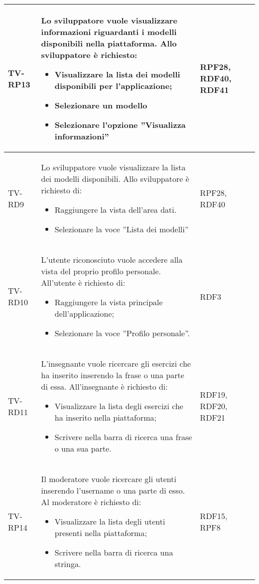 \begin{longtable}{|>{\centering\arraybackslash}m{1.6cm}|>{\centering\arraybackslash}m{6.41cm}|>{\centering\arraybackslash}m{3.1cm} | >{\centering\arraybackslash}m{2.6cm}|}
 TV-RP13 & Lo sviluppatore vuole visualizzare informazioni riguardanti i modelli disponibili nella piattaforma. Allo sviluppatore è richiesto:
 \begin{itemize}
  \item  Visualizzare la lista dei modelli disponibili per l’applicazione;
  \item Selezionare un modello
  \item Selezionare l’opzione ”Visualizza informazioni”
 \end{itemize}  & RPF28, RDF40, RDF41 \\ \hline

\rowcolor{LightGray}
TV-RD9 & Lo sviluppatore vuole visualizzare la lista dei modelli disponibili.  Allo sviluppatore è richiesto di:

\begin{itemize}
 \item Raggiungere la vista dell’area dati.
 \item Selezionare la voce ”Lista dei modelli”
\end{itemize}  & RPF28, RDF40 \\ \hline

TV-RD10 & L’utente riconosciuto vuole accedere alla vista del proprio profilo personale. All'utente è richiesto di:
\begin{itemize}
  \item Raggiungere la vista principale dell'applicazione;
 \item Selezionare la voce ”Profilo personale”.
\end{itemize}  & RDF3 \\ \hline

\rowcolor{LightGray}
TV-RD11 & L’insegnante vuole ricercare gli esercizi che ha inserito inserendo la frase o una parte di essa. All'insegnante è richiesto di:


\begin{itemize}
 \item Visualizzare la lista degli esercizi che ha inserito nella piattaforma;
 \item Scrivere nella barra di ricerca una frase o una sua parte.
\end{itemize}  & RDF19, RDF20, RDF21 \\ \hline

TV-RP14 & Il moderatore vuole ricercare gli utenti inserendo l’username o una parte di esso. Al moderatore è richiesto di:
\begin{itemize}
 \item Visualizzare la lista degli utenti presenti nella piattaforma;
 \item Scrivere nella barra di ricerca una stringa.
\end{itemize}  & RDF15, RPF8 \\ \hline


\end{longtable}
